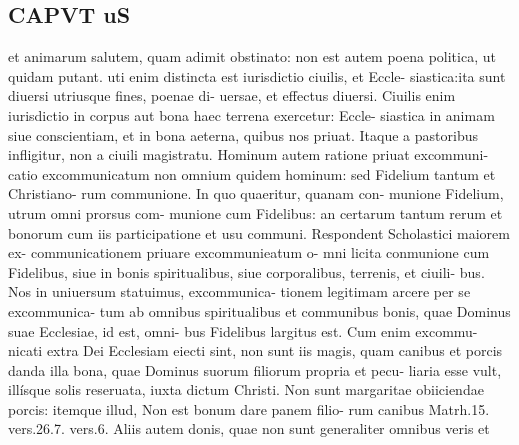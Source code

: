 \documentclass{article}
\begin{document}
\begin{pages}
\section*{CAPVT  uS }
\marginpar{[ p.401 ]}et animarum salutem, quam adimit obstinato: non est autem poena politica, ut quidam putant. uti enim distincta est iurisdictio ciuilis, et Eccle- siastica:ita sunt diuersi utriusque fines, poenae di- uersae, et effectus diuersi. Ciuilis enim iurisdictio in corpus aut bona haec terrena exercetur: Eccle- siastica in animam siue conscientiam, et in bona aeterna, quibus nos priuat. Itaque a pastoribus infligitur, non a ciuili magistratu. Hominum autem ratione priuat excommuni- catio excommunicatum non omnium quidem hominum: sed Fidelium tantum et Christiano- rum communione. In quo quaeritur, quanam con- munione Fidelium, utrum omni prorsus com- munione cum Fidelibus: an certarum tantum rerum et bonorum cum iis participatione et usu communi. Respondent Scholastici maiorem ex- communicationem priuare excommunieatum o- mni licita conmunione cum Fidelibus, siue in bonis spiritualibus, siue corporalibus, terrenis, et ciuili- bus. Nos in uniuersum statuimus, excommunica- tionem legitimam arcere per se excommunica- tum ab omnibus spiritualibus et communibus bonis, quae Dominus suae Ecclesiae, id est, omni- bus Fidelibus largitus est. Cum enim excommu- nicati extra Dei Ecclesiam eiecti sint, non sunt iis magis, quam canibus et porcis danda illa bona, quae Dominus suorum filiorum propria et pecu- liaria esse vult, illísque solis reseruata, iuxta dictum Christi. Non sunt margaritae obiiciendae porcis: itemque illud, Non est bonum dare panem filio- rum canibus Matrh.15. vers.26.7. vers.6. Aliis autem donis, quae non sunt generaliter omnibus veris et 

\end{pages}
\end{document}
